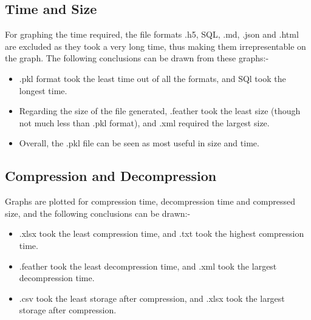 \documentclass[11pt]{article}
\begin{document}
\subsection{Time and Size}

For graphing the time required, the file formats .h5, SQL, .md, .json and .html are excluded as they took a very long time, thus making them irrepresentable on the graph.
The following conclusions can be drawn from these graphs:-

\begin{itemize}
    \item .pkl format took the least time out of all the formats, and SQl took the longest time.
    \item Regarding the size of the file generated, .feather took the least size (though not much less than .pkl format), and .xml required the largest size.
    \item Overall, the .pkl file can be seen as most useful in size and time.
\end{itemize}

\subsection{Compression and Decompression}

Graphs are plotted for compression time, decompression time and compressed size, and the following conclusions can be drawn:-

\begin{itemize}
    \item .xlsx took the least compression time, and .txt took the highest compression time.
    \item .feather took the least decompression time, and .xml took the largest decompression time.
    \item .csv took the least storage after compression, and .xlsx took the largest storage after compression.
\end{itemize}
\end{document}

